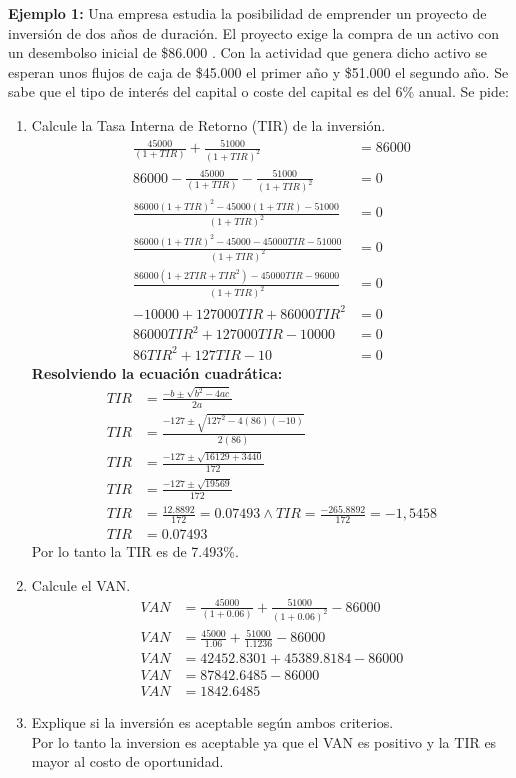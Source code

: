 \documentclass{templateNote}
\begin{document}
\newpage
\textbf{Ejemplo 1:} Una empresa estudia la posibilidad de emprender un proyecto de inversión de dos años de duración. El proyecto exige la compra de un activo con un desembolso inicial de \$86.000 . Con la actividad que genera dicho activo se esperan unos flujos de caja de \$45.000 el primer año y \$51.000 el segundo año. Se sabe que el tipo de interés del capital o coste del capital es del 6\% anual. Se pide:
\begin{enumerate}[label=\alph*)]
    \item Calcule la Tasa Interna de Retorno (TIR) de la inversión.
    \begin{align*}
        \frac{45000}{(1+TIR)} + \frac{51000}{(1+TIR)^2} &= 86000 \\
        86000 - \frac{45000}{(1+TIR)} - \frac{51000}{(1+TIR)^2} &= 0 \\
        \frac{86000(1+TIR)^2 - 45000(1+TIR) - 51000}{(1+TIR)^2} &= 0 \\
        \frac{86000(1+TIR)^2 - 45000 - 45000TIR - 51000}{(1+TIR)^2} &= 0 \\
        \frac{86000(1+2TIR+{TIR}^2)-45000TIR-96000}{(1+TIR)^2} &= 0 \\
        -10000 + 127000TIR + 86000{TIR}^2 &= 0 \\
        86000{TIR}^2 + 127000TIR - 10000 &= 0 \\
        86{TIR}^2 + 127TIR - 10 &= 0 
    \end{align*}
        \textbf{Resolviendo la ecuación cuadrática:}
    \begin{align*}
        TIR &= \frac{-b \pm \sqrt{b^2 - 4ac}}{2a} \\
        TIR &= \frac{-127 \pm \sqrt{127^2 - 4(86)(-10)}}{2(86)} \\
        TIR &= \frac{-127 \pm \sqrt{16129 + 3440}}{172} \\
        TIR &= \frac{-127 \pm \sqrt{19569}}{172} \\
        TIR &= \frac{12.8892}{172} = 0.07493 \wedge TIR = \frac{-265.8892}{172} = -1,5458 \\
        TIR &= 0.07493
    \end{align*}
    Por lo tanto la TIR es de 7.493\%.
    \item Calcule el VAN.
    \begin{align*}
        VAN &= \frac{45000}{(1+0.06)} + \frac{51000}{(1+0.06)^2} - 86000 \\
        VAN &= \frac{45000}{1.06} + \frac{51000}{1.1236} - 86000 \\
        VAN &= 42452.8301 + 45389.8184 - 86000 \\
        VAN &= 87842.6485 - 86000 \\
        VAN &= 1842.6485
    \end{align*}
    \item Explique si la inversión es aceptable según ambos criterios.
    \\Por lo tanto la inversion es aceptable ya que el VAN es positivo y la TIR es mayor al costo de oportunidad.
\end{enumerate}
\end{document}

